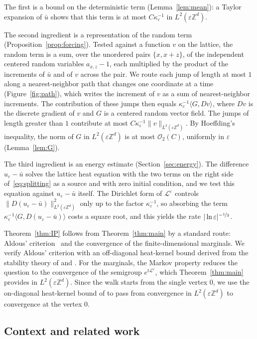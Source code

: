 \documentclass[11pt]{amsart}
\numberwithin{equation}{section}
\newcommand{\Z}{\mathbb{Z}}
\newcommand{\cO}{\mathcal{O}}
\newcommand{\eps}{\varepsilon}
\newcommand{\Leps}{\mathcal{L}^\varepsilon}
\newcommand{\nf}{\nicefrac}
\begin{document}
The first is a bound on the deterministic term (Lemma~\ref{lem:mean}): a Taylor expansion of $\bar u$ shows that this term is at most $C \kappa_\eps^{-1}$ in $L^2(\eps \Z^d)$.

The second ingredient is a representation of the random term (Proposition~\ref{prop:forcing}).
Tested against a function $v$ on the lattice, the random term is a sum, over the unordered pairs $\{x, x+z\}$, of the independent centered random variables $a_{x,z} - 1$, each multiplied by the product of the increments of $\bar u$ and of $v$ across the pair.
We route each jump of length at most $1$ along a nearest-neighbor path that changes one coordinate at a time (Figure~\ref{fig:path}), which writes the increment of $v$ as a sum of nearest-neighbor increments.
The contribution of these jumps then equals $\kappa_\eps^{-1} \langle G, D v \rangle$, where $D v$ is the discrete gradient of $v$ and $G$ is a centered random vector field.
The jumps of length greater than $1$ contribute at most $C \kappa_\eps^{-1} \|v\|_{L^2(\eps \Z^d)}$.
By Hoeffding's inequality, the norm of $G$ in $L^2(\eps \Z^d)$ is at most $\cO_2(C)$, uniformly in $\eps$ (Lemma~\ref{lem:G}).

The third ingredient is an energy estimate (Section~\ref{sec:energy}).
The difference $u_\eps - \bar u$ solves the lattice heat equation with the two terms on the right side of~\eqref{eq:splitting} as a source and with zero initial condition, and we test this equation against $u_\eps - \bar u$ itself.
The Dirichlet form of $\Leps$ controls $\|D(u_\eps - \bar u)\|_{L^2(\eps \Z^d)}^2$ only up to the factor $\kappa_\eps^{-1}$, so absorbing the term $\kappa_\eps^{-1} \langle G, D(u_\eps - \bar u) \rangle$ costs a square root, and this yields the rate $|\ln \eps|^{-\nf12}$.

Theorem~\ref{thm:IP} follows from Theorem~\ref{thm:main} by a standard route: Aldous' criterion~\citep{Aldous1978} and the convergence of the finite-dimensional marginals.
We verify Aldous' criterion with an off-diagonal heat-kernel bound derived from the stability theory of \citet*{CKW2021Stability} and \citet{Malmquist2023}.
For the marginals, the Markov property reduces the question to the convergence of the semigroup $e^{t \Leps}$, which Theorem~\ref{thm:main} provides in $L^2(\eps \Z^d)$.
Since the walk starts from the single vertex $0$, we use the on-diagonal heat-kernel bound of \citet[Theorem~1.1]{MSC2015} to pass from convergence in $L^2(\eps \Z^d)$ to convergence at the vertex $0$.

\subsection{Context and related work}
\end{document}
